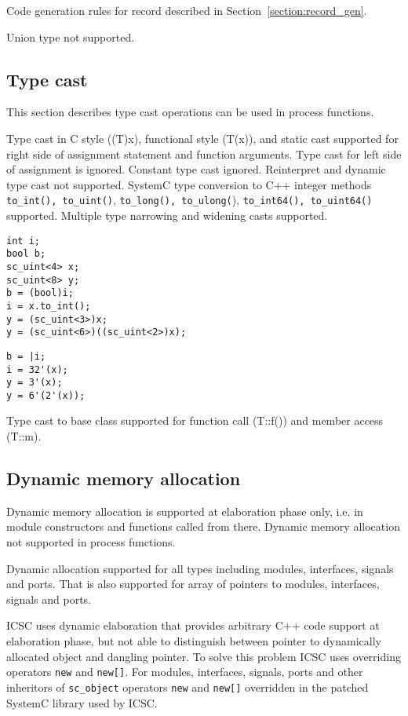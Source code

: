 Code generation rules for record described in Section~\ref{section:record_gen}. 

Union type not supported.

\subsection{Type cast}

This section describes type cast operations can be used in process functions. 

Type cast in C style ((T)x), functional style (T(x)), and static cast supported for right side of assignment statement and function arguments. Type cast for left side of assignment is ignored. Constant type cast ignored. Reinterpret and dynamic type cast not supported. 
SystemC type conversion to C++ integer methods {\tt to\_int(), to\_uint()}, {\tt to\_long(), to\_ulong(}), {\tt to\_int64(), to\_uint64()} supported. Multiple type narrowing and widening casts supported.
%
\begin{lstlisting}[style=mycpp]
int i;
bool b;
sc_uint<4> x;
sc_uint<8> y;
b = (bool)i; 
i = x.to_int();
y = (sc_uint<3>)x;
y = (sc_uint<6>)((sc_uint<2>)x);
\end{lstlisting}
%
\begin{lstlisting}[style=myverilog]
b = |i;
i = 32'(x);
y = 3'(x);
y = 6'(2'(x));
\end{lstlisting}

Type cast to base class supported for function call (T::f()) and member access (T::m).


\subsection{Dynamic memory allocation}

Dynamic memory allocation is supported at elaboration phase only, i.e. in module constructors and functions called from there. Dynamic memory allocation not supported in process functions.

Dynamic allocation supported for all types including modules, interfaces, signals and ports. That is also supported for array of pointers to modules, interfaces, signals and ports.

ICSC uses dynamic elaboration that provides arbitrary C++ code support at elaboration phase, but not able to distinguish between pointer to dynamically allocated object and dangling pointer. To solve this problem ICSC uses overriding operators {\tt new} and {\tt new[]}. For modules, interfaces, signals, ports and other inheritors of {\tt sc\_object} operators {\tt new} and {\tt new[]} overridden in the patched SystemC library used by ICSC. 

